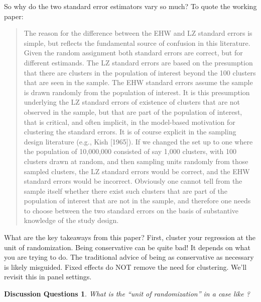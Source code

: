 \documentclass{tufte-handout}
\theoremstyle{break}
\newtheorem{discussion}{Discussion Questions}
\begin{document}
So why do the two standard error estimators vary so much? To quote the \citet{abadie2023should} working paper:
\begin{fullwidth}
\begin{quote}
  The reason for the difference between the EHW and LZ standard errors is simple, but
  reflects the fundamental source of confusion in this literature. Given the random assignment
  both standard errors are correct, but for different estimands. The LZ standard errors are based
  on the presumption that there are clusters in the population of interest beyond the 100 clusters
  that are seen in the sample. The EHW standard errors assume the sample is drawn randomly
  from the population of interest. It is this presumption underlying the LZ standard errors of
  existence of clusters that are not observed in the sample, but that are part of the population
  of interest, that is critical, and often implicit, in the model-based motivation for clustering the standard errors. It is of course explicit in the sampling design literature (e.g., Kish [1965]). If we changed the set up to one where the population of 10,000,000 consisted of say 1,000 clusters,
  with 100 clusters drawn at random, and then sampling units randomly from those sampled
  clusters, the LZ standard errors would be correct, and the EHW standard errors would be
  incorrect. Obviously one cannot tell from the sample itself whether there exist such clusters
  that are part of the population of interest that are not in the sample, and therefore one needs
  to choose between the two standard errors on the basis of substantive knowledge of the study
  design.
\end{quote}
\end{fullwidth}

What are the key takeaways from this paper? First, cluster your regression at the unit of randomization. Being conservative can be quite bad! It depends on what you are trying to do.
The traditional advice of being as conservative as necessary is likely misguided. Fixed effects do NOT remove the need for clustering. We'll revisit this in panel settings. 

\begin{boxK}
  \begin{discussion}
    What is the ``unit of randomization'' in a case like \citet{card1994minimum}?
  \end{discussion}
\end{boxK}
\end{document}

